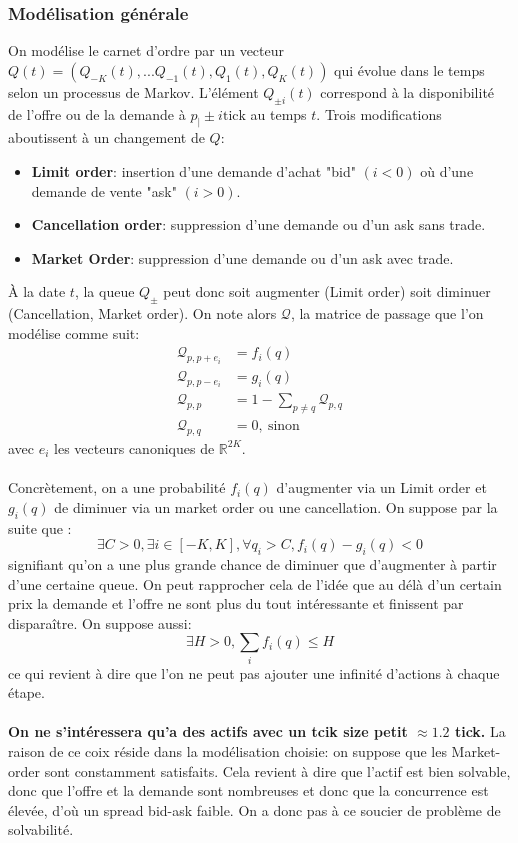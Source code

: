 \documentclass[12pt,a4paper]{article}
\theoremstyle{definition}
\theoremstyle{remark}
\begin{document}
\subsubsection {Modélisation générale}
On modélise le carnet d'ordre par un vecteur $Q(t) = (Q_{-K}(t),...Q_{-1}(t),Q_{1}(t),Q_K(t))$ qui évolue dans le temps selon un processus de Markov. L'élément $Q_{\pm i}(t)$ correspond à la disponibilité de l'offre ou de la demande à $p_{\mid}\pm i\text{tick}$ au temps $t$.
Trois modifications aboutissent à un changement de $Q$:
\begin{itemize}
    \item \textbf{Limit order}: insertion d'une demande d'achat "bid" $(i<0)$ où d'une demande de vente "ask" $(i>0)$.
    \item \textbf{Cancellation order}: suppression d'une demande ou d'un ask sans trade.
    \item \textbf{Market Order}: suppression d'une demande ou d'un ask avec trade.
    \end{itemize}
À la date $t$, la queue $Q_{\pm}$ peut donc soit augmenter (Limit order) soit diminuer (Cancellation, Market order).
On note alors $\mathcal Q$, la matrice de passage que l'on modélise comme suit:
$$\begin{aligned}
\mathcal Q_{p,p+e_i} &= f_i(q) \\
    \mathcal Q_{p,p-e_i} &= g_i(q) \\
    \mathcal Q_{p,p} &= 1 - \sum_{p \neq q} \mathcal Q_{p,q} \\
    \mathcal Q_{p,q} &= 0, \ \text{sinon}
    \end{aligned}$$
avec $e_i$ les vecteurs canoniques de $\mathbb{R}^{2K}$.
    \\
    \\
Concrètement, on a une probabilité $f_i(q)$ d'augmenter via un Limit order et $g_i(q)$ de diminuer via un market order ou une cancellation. On suppose par la suite que :
$$\exists C>0, \exists i\in [-K,K], \forall q_i>C, f_i(q)-g_i(q)<0$$ signifiant qu'on a une plus grande chance de diminuer que d'augmenter à partir d'une certaine queue. On peut rapprocher cela de l'idée que au délà d'un certain prix la demande et l'offre ne sont plus du tout intéressante et finissent par disparaître. On suppose aussi:$$\exists H>0, \sum_if_i(q)\leq H$$ ce qui revient à dire que l'on ne peut pas ajouter une infinité d'actions à chaque étape.
\\
\\
\textbf{On ne s’intéressera qu'a des actifs avec un tcik size petit $\approx 1.2$ tick.} La raison de ce coix réside dans la modélisation choisie: on suppose que les Market-order sont constamment satisfaits. Cela revient à dire que l'actif est bien solvable, donc que l'offre et la demande sont nombreuses et donc que la concurrence est élevée, d'où un spread bid-ask faible. On a donc pas à ce soucier de problème de solvabilité.
\end{document}
